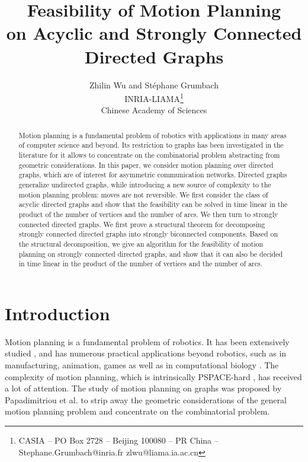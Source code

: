 \documentclass{article}
\begin{document}
\title{Feasibility of Motion Planning\\ on Acyclic and Strongly Connected Directed Graphs}
\author{Zhilin Wu and St\'{e}phane Grumbach \\
INRIA-LIAMA\thanks{CASIA -- PO Box 2728 --
Beijing 100080 -- PR China -- Stephane.Grumbach@inria.fr  zlwu@liama.ia.ac.cn}\\
Chinese Academy of Sciences}

\maketitle


\begin{abstract}
Motion planning is a fundamental problem of robotics with
applications in many areas of computer science and beyond. Its
restriction to graphs has been investigated in the literature for it
allows to concentrate on the combinatorial problem abstracting from
geometric considerations.  In this paper, we consider motion
planning over directed graphs, which are of interest for asymmetric
communication networks. Directed graphs generalize undirected
graphs, while introducing a new source of complexity to the motion
planning problem: moves are not reversible. We first consider the
class of acyclic directed graphs and show that the feasibility can
be solved in time linear in the product of the number of vertices
and the number of arcs. We then turn to strongly connected directed
graphs. We first prove a structural theorem for decomposing strongly
connected directed graphs into strongly biconnected components.
Based on the structural decomposition, we give an algorithm for the
feasibility of motion planning on strongly connected directed
graphs, and show that it can also be decided in time linear in the
product of the number of vertices and the number of arcs.
\end{abstract}


\section{Introduction}


Motion planning is a fundamental problem of robotics. It has been
extensively studied \cite{Lavalle06}, and has numerous practical
applications beyond robotics, such as in manufacturing, animation,
games \cite{MPG} as well as in computational biology
\cite{SA01,FK99}. The complexity of motion planning, which is
intrinsically PSPACE-hard \cite{Latombe95,Lavalle06}, has received a
lot of attention. The study of motion planning on graphs was
proposed by Papadimitriou et al. \cite{PapadimitriouRST94} to strip
away the geometric considerations of the general motion planning
problem and concentrate on the combinatorial problem.
\end{document}
